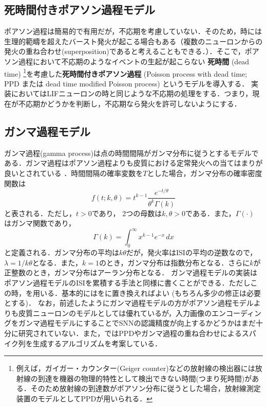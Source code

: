 \subsection{死時間付きポアソン過程モデル}
ポアソン過程は簡易的で有用だが，不応期を考慮していない．そのため，時には生理的範疇を超えたバースト発火が起こる場合もある（複数のニューロンからの発火の重ね合わせ(superposition)であると考えることもできる．）．そこで，ポアソン過程において不応期のようなイベントの生起が起こらない \textbf{死時間} (dead time) \footnote{例えば，ガイガー・カウンター(Geiger counter)などの放射線の検出器には放射線の到達を機器の物理的特性として検出できない時間(つまり死時間)がある．そのため放射線の到達数がポアソン分布に従うとした場合，放射線測定装置のモデルとしてPPDが用いられる．}を考慮した\textbf{死時間付きポアソン過程} (Poisson process with dead time; PPD または dead time modified Poisson process) というモデルを導入する．
実装においてはLIFニューロンの時と同じような不応期の処理をする．つまり，現在が不応期かどうかを判断し，不応期なら発火を許可しないようにする．
\subsection{ガンマ過程モデル}
ガンマ過程(gamma process)は点の時間間隔がガンマ分布に従うとするモデルである．ガンマ過程はポアソン過程よりも皮質における定常発火への当てはまりが良いとされている \citep{Shinomoto2003-lz,Maimon2009-mb}．時間間隔の確率変数を$T$とした場合，ガンマ分布の確率密度関数は
\begin{equation}
f(t;k,\theta) =  t^{k-1}\frac{e^{-t/\theta}}{\theta^k\Gamma(k)}
\end{equation}
と表される．ただし，$t > 0$であり， 2つの母数は$k, \theta > 0$である．また，$\Gamma (\cdot)$ はガンマ関数であり，
\begin{equation}
\Gamma (k)=\int _{0}^{\infty }x^{k-1}e^{-x}\,dx
\end{equation}
と定義される．ガンマ分布の平均は$k\theta$だが，発火率はISIの平均の逆数なので，$\lambda=1/k\theta$となる．また，$k=1$のとき，ガンマ分布は指数分布となる．さらに$k$が正整数のとき，ガンマ分布はアーラン分布となる．
ガンマ過程モデルの実装はポアソン過程モデルのISIを累積する手法と同様に書くことができる．ただしこの時，を用いる．基本的にはをに置き換えればよい (もちろん多少の修正は必要とする)．
なお，前述したようにガンマ過程モデルの方がポアソン過程モデルよりも皮質ニューロンのモデルとしては優れているが，入力画像のエンコーディングをガンマ過程モデルにすることでSNNの認識精度が向上するかどうかはまだ十分に研究されていない．また，\citep{Deger2012-ai}ではPPDやガンマ過程の重ね合わせによるスパイク列を生成するアルゴリズムを考案している．
